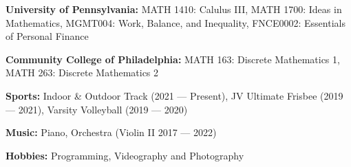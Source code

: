 \documentclass[9pt,letterpaper,ragged2e,withhyper]{altacv}
\begin{document}
\begin{paracol}{2}
\textbf{University of Pennsylvania:} MATH 1410: Calulus III, MATH 1700: Ideas in Mathematics, MGMT004: Work, Balance, and Inequality, FNCE0002: Essentials of Personal Finance
\smallskip

\textbf{Community College of Philadelphia:} MATH 163: Discrete Mathematics 1, MATH 263: Discrete Mathematics 2


\textbf{Sports:} Indoor \& Outdoor Track (2021 --- Present), JV Ultimate Frisbee (2019 --- 2021), Varsity Volleyball (2019 --- 2020)
\smallskip

\textbf{Music:} Piano, Orchestra (Violin II 2017 --- 2022)
\smallskip

\textbf{Hobbies:} Programming, Videography and Photography



\end{paracol}
\end{document}
